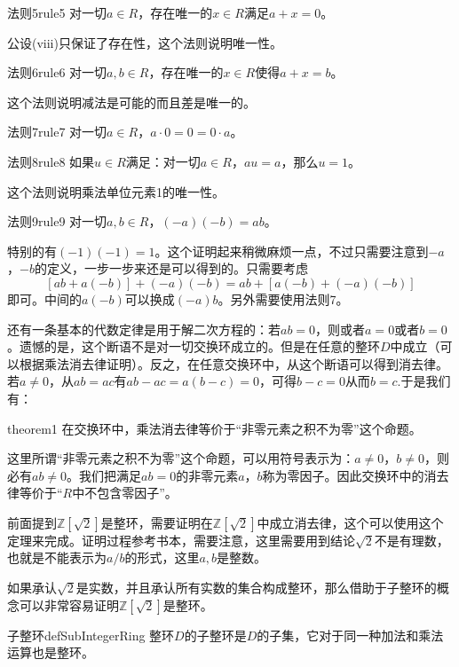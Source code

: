 \begin{corollary}{法则5}{rule5}
对一切$a \in R$，存在唯一的$x \in R$满足$a+x=0$。
\end{corollary}
公设(viii)只保证了存在性，这个法则说明唯一性。

\begin{corollary}{法则6}{rule6}
对一切$a, b \in R$，存在唯一的$x \in R$使得$a+x=b$。
\end{corollary}
这个法则说明减法是可能的而且差是唯一的。

\begin{corollary}{法则7}{rule7}
对一切$a \in R$，$a \cdot 0 = 0 = 0 \cdot a$。
\end{corollary}

\begin{corollary}{法则8}{rule8}
如果$u \in R$满足：对一切$a \in R$，$au=a$，那么$u=1$。
\end{corollary}
这个法则说明乘法单位元素1的唯一性。

\begin{corollary}{法则9}{rule9}
对一切$a, b \in R$，$(-a)(-b)=ab$。
\end{corollary}

特别的有$(-1)(-1)=1$。这个证明起来稍微麻烦一点，不过只需要注意到$-a$，$-b$的定义，一步一步来还是可以得到的。只需要考虑
\[
[ab + a(-b)] + (-a)(-b) = ab + [a(-b) + (-a)(-b)]
\]
即可。中间的$a(-b)$可以换成$(-a)b$。另外需要使用法则7。

还有一条基本的代数定律是用于解二次方程的：若$ab=0$，则或者$a=0$或者$b=0$。遗憾的是，这个断语不是对一切交换环成立的。但是在任意的整环$D$中成立（可以根据乘法消去律证明）。反之，在任意交换环中，从这个断语可以得到消去律。若$a \neq 0$，从$ab=ac$有$ab-ac=a(b-c)=0$，可得$b-c=0$从而$b=c$.于是我们有：
\begin{theorem}{}{theorem1}
在交换环中，乘法消去律等价于“非零元素之积不为零”这个命题。
\end{theorem}
这里所谓“非零元素之积不为零”这个命题，可以用符号表示为：$a \neq 0$，$b \neq 0$，则必有$ab \neq 0$。我们把满足$ab=0$的非零元素$a$，$b$称为零因子。因此交换环中的消去律等价于“$R$中不包含零因子”。

前面提到$\mathbb{Z}[\sqrt{2}]$是整环，需要证明在$\mathbb{Z}[\sqrt{2}]$中成立消去律，这个可以使用这个定理来完成。证明过程参考书本，需要注意，这里需要用到结论$\sqrt{2}$不是有理数，也就是不能表示为$a/b$的形式，这里$a, b$是整数。

如果承认$\sqrt{2}$是实数，并且承认所有实数的集合构成整环，那么借助于子整环的概念可以非常容易证明$\mathbb{Z}[\sqrt{2}]$是整环。
\begin{definition}{子整环}{defSubIntegerRing}
整环$D$的子整环是$D$的子集，它对于同一种加法和乘法运算也是整环。
\end{definition}

